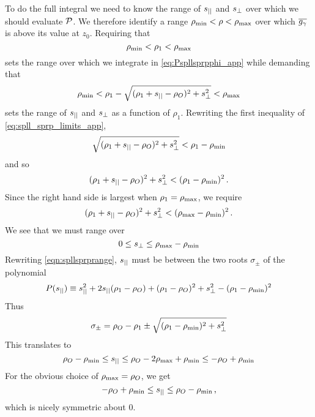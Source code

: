 \documentclass[fleqn,usenatbib]{mnras}
\begin{document}
    To do the full integral we need to know the range of $s_{||}$ and $s_{\perp}$
    over which we should evaluate $\mathcal{P}$.  We therefore identify a range
    $\rho_{\rm min}<\rho<\rho_{\rm max}$ over which $\overline{g_\gamma}$ is above its
    value at $z_0$.  Requiring that
    \begin{equation}
        \rho_{\rm min} < \rho_1 < \rho_{\rm max}
    \end{equation}
    sets the range over which we integrate in \autoref{eq:Pspllsprpphi_app}
    while demanding that
    \begin{equation}
        \label{eq:spll_sprp_limits_app}
        \rho_{\rm min} < \rho_1 - \sqrt{(\rho_1+s_{||}-\rho_O)^2+ s_{\perp}^2} < \rho_{\rm max}
    \end{equation}
    sets the range of $s_{||}$ and $s_{\perp}$ as a function of $\rho_1$.  Rewriting
    the first inequality of \autoref{eq:spll_sprp_limits_app},
    \begin{equation}
        \sqrt{(\rho_1+s_{||}-\rho_O)^2+ s_{\perp}^2} < \rho_1-\rho_{\rm min}
    \end{equation}
    and so
    \begin{equation} 
    \label{eqn:spllsprprange}
        (\rho_1+s_{||}-\rho_O)^2+ s_{\perp}^2 < (\rho_1-\rho_{\rm min})^2 \,.
    \end{equation}
    Since the right hand side is largest when $\rho_1=\rho_{\rm max}$, we
    require
    \begin{equation}
        (\rho_1+s_{||}-\rho_O)^2+ s_{\perp}^2 < (\rho_{\rm max}-\rho_{\rm min})^2 \,.
    \end{equation}
    We see that we must range over
    \begin{equation}
         0 \leq s_{\perp} \leq \rho_{\rm max}-\rho_{\rm min}
    \end{equation}
    Rewriting \autoref{eqn:spllsprprange}, $s_{||}$ must be between the two roots
    $\sigma_\pm$ of the polynomial
    \begin{equation}
        P(s_{||}) \equiv
        s_{||}^2+2s_{||}(\rho_1-\rho_O) + (\rho_1-\rho_O)^2 + s_{\perp}^2 - (\rho_1-\rho_{\rm min})^2
        \nonumber
    \end{equation}
    Thus
    \begin{equation}
        \sigma_\pm = 
         \rho_O-\rho_1 \pm 
         \sqrt{(\rho_1-\rho_{\rm min})^2 + s_{\perp}^2}
    \end{equation}
    This translates to
    \begin{equation}
        \rho_O-\rho_{\rm min} \leq 
        s_{||} 
        \leq
        \rho_O-2\rho_{\rm max}+\rho_{\rm min}
        \leq 
        -\rho_O+\rho_{\rm min}
    \end{equation}
    For the obvious choice of $\rho_{\rm max}=\rho_O$, we get
    \begin{equation}
        -\rho_O + \rho_{\rm min} \leq s_{||}  \leq \rho_O - \rho_{\rm min} \,,
    \end{equation}
    which is nicely symmetric about $0$.
\end{document}
